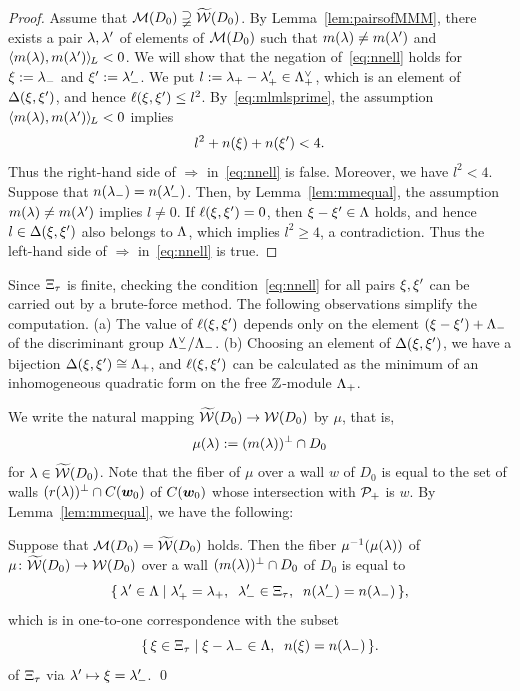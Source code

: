 \documentclass{amsart} %
\begin{document}
%
\begin{proof}
Assume that $\mathord{\mathcal{M}}(D_0)\supsetneqq\widetilde{\mathord{\mathcal{W}}} (D_0)$.
By Lemma~\ref{lem:pairsofMMM},
there exists a pair $\lambda, \lambda^{\prime}$ of elements of $ \mathord{\mathcal{M}}(D_0)$
such that $m(\lambda)\ne m(\lambda^{\prime})$ and $ \langle m(\lambda), m(\lambda^{\prime}) \rangle_{\hskip -1pt L} <0$.
We will show that the negation of~\eqref{eq:nnell} holds for
$\xi:={\lambda}_{-}$ and $\xi^{\prime}:={\lambda}_{-}^{\prime}$.
We put $l:={\lambda}_{+}-{\lambda}_{+}^{\prime}\in \Lambda_{+}^{\vee}$,
which is an element of $\Delta(\xi, \xi^{\prime})$,
and hence $\ell(\xi, \xi^{\prime})\le l^2$.
By~\eqref{eq:mlmlsprime},
the assumption $ \langle m(\lambda), m(\lambda^{\prime}) \rangle_{\hskip -1pt L} <0$ implies 
%
\begin{equation*}\label{eq:lnn}
l^2+n(\xi)+n(\xi^{\prime})<4.
\end{equation*}
%
Thus the right-hand side of $\Longrightarrow$ in~\eqref{eq:nnell} is false.
Moreover, we have $l^2<4$.
Suppose that $n({\lambda}_{-})=n({\lambda}_{-}^{\prime})$.
Then, by Lemma~\ref{lem:mmequal},
the assumption $m(\lambda)\ne m(\lambda^{\prime})$ implies $l\ne 0$.
If $\ell(\xi, \xi^{\prime})= 0$, then 
$\xi-\xi^{\prime}\in \Lambda$ holds, and hence 
$l\in \Delta(\xi, \xi^{\prime})$ also belongs to $\Lambda$,
which implies $l^2\ge 4$, a contradiction.
Thus the left-hand side of $\Longrightarrow$ in~\eqref{eq:nnell} is true.
\end{proof}
%
\begin{remark}\label{rem:MMMtilwalls}
Since $\Xi_{\tau}$ is finite,
checking the condition~\eqref{eq:nnell} for all pairs $\xi, \xi^{\prime}$
 can be carried out by a brute-force method.
The following observations simplify the computation.
(a) 
The value of $\ell(\xi, \xi^{\prime})$ depends only on the element $(\xi-\xi^{\prime})+\Lambda_{-}$
of the discriminant group $\Lambda_{-}^{\vee}/\Lambda_{-}$.
(b) 
Choosing an element of $\Delta(\xi, \xi^{\prime})$, 
we have a bijection $\Delta(\xi, \xi^{\prime})\cong \Lambda_{+}$,
and $\ell(\xi, \xi^{\prime})$ can be calculated as the minimum of
an inhomogeneous quadratic form on the free $\mathord{\mathbb{Z}}$-module $\Lambda_{+}$.
\end{remark}
%
We write the natural mapping
$\widetilde{\mathord{\mathcal{W}}}(D_0)\to \mathord{\mathcal{W}}(D_0)$
by $\mu$, that is, 
\[
\mu(\lambda):=(m(\lambda))^{\perp}\cap D_0
\]
for $\lambda\in \widetilde{\mathord{\mathcal{W}}}(D_0)$.
Note that the fiber of $\mu$ over a wall $w$
of $D_0$ is equal to the set of walls $(r(\lambda))^{\perp}\cap \mathord{C}(\boldsymbol{w}_0)$
of $\mathord{C}(\boldsymbol{w}_0)$ whose intersection with $\mathord{\mathcal{P}}_{+}$ is $w$.
By Lemma~\ref{lem:mmequal}, we have the following:
%
\begin{lemma}\label{lem:wallfiber}
Suppose that $\mathord{\mathcal{M}}(D_0)=\widetilde{\mathord{\mathcal{W}}} (D_0)$ holds.
Then the fiber $\mu^{-1}(\mu(\lambda))$ of %
$\mu\colon \widetilde{\mathord{\mathcal{W}}}(D_0)\to \mathord{\mathcal{W}}(D_0)$
over a wall $(m(\lambda))^{\perp}\cap D_0$ of $D_0$
is equal to
\[
\set{\lambda\sprime\in \Leech}%
{\lambdaplus\sprime=\lambdaplus, \;\; \lambdaminus\sprime\in \Xitau, \;\; n(\lambdaminus\sprime)=n(\lambdaminus)},
\]
which is in one-to-one correspondence with the subset 
\[
\{\,{\xi\in \Xi_{\tau}}\mid {\xi-{\lambda}_{-}\in \Lambda, \;\; n(\xi)=n({\lambda}_{-})} \,\}.
\]
of $\Xi_{\tau}$ via $\lambda^{\prime} \mapsto \xi={\lambda}_{-}^{\prime}$.
\qed
\end{lemma}
\end{document}
